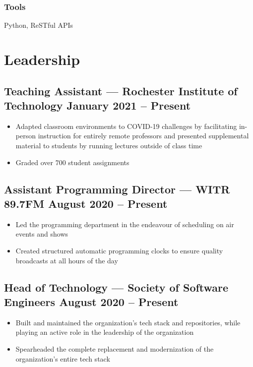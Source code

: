 \documentclass[11pt, letterpaper]{article}
\begin{document}
            \subsubsection{Tools}
                Python, ReSTful APIs

    \section{Leadership}
        \subsection{Teaching Assistant --- Rochester Institute of Technology \hfill January 2021 -- Present}
            \begin{itemize}[nosep]
                \item Adapted classroom environments to COVID-19 challenges by facilitating in-person
                    instruction for entirely remote professors and presented supplemental material to 
                    students by running lectures outside of class time
                \item Graded over 700 student assignments
            \end{itemize}

        \subsection{Assistant Programming Director --- WITR 89.7FM \hfill August 2020 -- Present}
            \begin{itemize}[nosep]
                \item Led the programming department in the endeavour of scheduling on air events and shows
                \item Created structured automatic programming clocks to ensure quality broadcasts at all 
                    hours of the day
            \end{itemize}

        \subsection{Head of Technology --- Society of Software Engineers \hfill August 2020 -- Present}
            \begin{itemize}[nosep]
                \item Built and maintained the organization's tech stack and repositories, while playing an active 
                    role in the \newline leadership of the organization 
                \item Spearheaded the complete replacement and modernization of the organization's entire tech 
                    stack
            \end{itemize}
\end{document}
